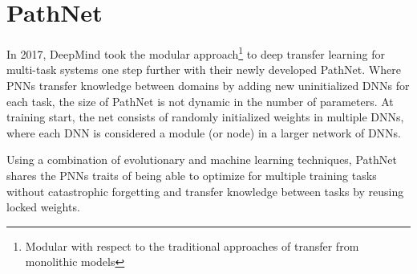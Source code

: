 \documentclass[a4paper,english]{report}
\begin{document}
\section{PathNet}\label{pathnet}
In 2017, DeepMind took the modular approach\footnote{Modular with respect to the traditional approaches of transfer from monolithic models} to deep transfer learning for multi-task systems one step further with their newly developed PathNet\cite{pathnet}. Where PNNs transfer knowledge between domains by adding new uninitialized DNNs for each task, the size of PathNet is not dynamic in the number of parameters. At training start, the net consists of randomly initialized weights in multiple DNNs, where each DNN is considered a module (or node) in a larger network of DNNs. 

Using a combination of evolutionary and machine learning techniques, PathNet shares the PNNs traits of being able to optimize for multiple training tasks without catastrophic forgetting and transfer knowledge between tasks by reusing locked weights.  
\end{document}
